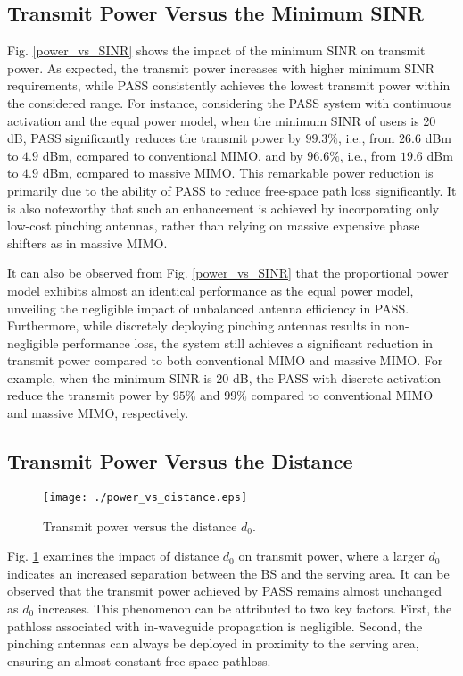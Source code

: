 \subsection{Transmit Power Versus the Minimum SINR}

Fig. \ref{power_vs_SINR} shows the impact of the minimum SINR on transmit power. As expected, the transmit power increases with higher minimum SINR requirements, while PASS consistently achieves the lowest transmit power within the considered range. For instance, considering the PASS system with continuous activation and the equal power model, when the minimum SINR of users is 20 dB, PASS significantly reduces the transmit power by $99.3\%$, i.e., from $26.6$ dBm to $4.9$ dBm, compared to conventional MIMO, and by $96.6\%$, i.e., from $19.6$ dBm to $4.9$ dBm, compared to massive MIMO. This remarkable power reduction is primarily due to the ability of PASS to reduce free-space path loss significantly. It is also noteworthy that such an enhancement is achieved by incorporating only low-cost pinching antennas, rather than relying on massive expensive phase shifters as in massive MIMO.

It can also be observed from Fig. \ref{power_vs_SINR} that the proportional power model exhibits almost an identical performance as the equal power model, unveiling the negligible impact of unbalanced antenna efficiency in PASS. Furthermore, while discretely deploying pinching antennas results in non-negligible performance loss, the system still achieves a significant reduction in transmit power compared to both conventional MIMO and massive MIMO. For example, when the minimum SINR is $20$ dB, the PASS with discrete activation reduce the transmit power by $95\%$ and $99\%$ compared to conventional MIMO and massive MIMO, respectively.


\subsection{Transmit Power Versus the Distance}


\begin{figure}[t!]
  \centering
  \texttt{[image: ./power\_vs\_distance.eps]}
  \caption{Transmit power versus the distance $d_0$.}
  \label{power_vs_distance}
\end{figure} 

Fig. \ref{power_vs_distance} examines the impact of distance $d_0$ on transmit power, where a larger $d_0$ indicates an increased separation between the BS and the serving area. It can be observed that the transmit power achieved by PASS remains almost unchanged as $d_0$ increases. This phenomenon can be attributed to two key factors. First, the pathloss associated with in-waveguide propagation is negligible. Second, the pinching antennas can always be deployed in proximity to the serving area, ensuring an almost constant free-space pathloss. 


